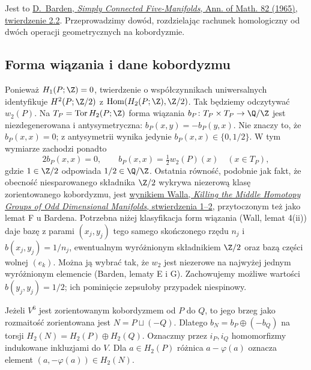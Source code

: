 Jest to
\href{https://www.sas.rochester.edu/mth/sites/doug-ravenel/otherpapers/barden.pdf}
{D.\ Barden, \emph{Simply Connected Five-Manifolds},
Ann. of Math. 82 (1965), twierdzenie 2.2}.
Przeprowadzimy dowód, rozdzielając
rachunek homologiczny od dwóch operacji
geometrycznych na kobordyzmie.

\subsection*{Forma wiązania i dane kobordyzmu}

Ponieważ $H_1(P;\Z)=0$, twierdzenie o
współczynnikach uniwersalnych identyfikuje
$H^2(P;\Z/2)$ z
$\operatorname{Hom}(H_2(P;\Z),\Z/2)$.
Tak będziemy odczytywać $w_2(P)$.
Na $T_P=\operatorname{Tor}H_2(P;\Z)$
forma wiązania
$b_P\colon T_P\times T_P\to\Q/\Z$
jest niezdegenerowana i antysymetryczna:
$b_P(x,y)=-b_P(y,x)$. Nie znaczy to,
że $b_P(x,x)=0$; z antysymetrii wynika
jedynie $b_P(x,x)\in\{0,1/2\}$.
W tym wymiarze zachodzi ponadto
\[
  2b_P(x,x)=0,\qquad
  b_P(x,x)=\tfrac12 w_2(P)(x)
  \quad(x\in T_P),
\]
gdzie $1\in\Z/2$ odpowiada $1/2\in\Q/\Z$.
Ostatnia równość, podobnie jak fakt,
że obecność niesparowanego składnika
$\Z/2$ wykrywa niezerową klasę
zorientowanego kobordyzmu, jest
\href{https://webhomes.maths.ed.ac.uk/~v1ranick/papers/kill.pdf}
{wynikiem Walla, \emph{Killing the Middle Homotopy Groups
of Odd Dimensional Manifolds}, stwierdzenia 1--2},
przytoczonym też jako lemat F u Bardena.
Potrzebna niżej klasyfikacja form wiązania
(Wall, lemat 4(ii)) daje bazę z parami
$(x_j,y_j)$ tego samego skończonego rzędu
$n_j$ i $b(x_j,y_j)=1/n_j$, ewentualnym
wyróżnionym składnikiem $\Z/2$ oraz
bazą części wolnej $(e_k)$. Można ją
wybrać tak, że $w_2$ jest niezerowe
na najwyżej jednym wyróżnionym elemencie
(Barden, lematy E i G). Zachowujemy
możliwe wartości $b(y_j,y_j)=1/2$;
ich pominięcie zepsułoby przypadek niespinowy.

Jeżeli $V^6$ jest zorientowanym kobordyzmem
od $P$ do $Q$, to jego brzeg jako
rozmaitość zorientowana jest
$N=P\sqcup(-Q)$. Dlatego
$b_N=b_P\oplus(-b_Q)$ na torsji
$H_2(N)=H_2(P)\oplus H_2(Q)$.
Oznaczmy przez $i_P,i_Q$ homomorfizmy
indukowane inkluzjami do $V$.
Dla $a\in H_2(P)$ różnica
$a-\varphi(a)$ oznacza element
$(a,-\varphi(a))\in H_2(N)$.

